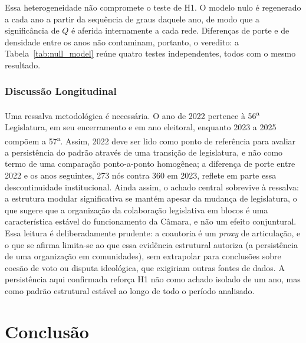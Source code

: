 \documentclass[
      12pt,
      a4paper,
      openright,
      oneside,
      chapter=TITLE,
      section=TITLE,
      english,
      french,
      spanish,
      brazilian
    ]{abntex2}
\begin{document}
    Essa heterogeneidade não compromete o teste de H1. O modelo nulo é regenerado a cada ano a partir da sequência de graus daquele ano, de modo que a significância de $Q$ é aferida internamente a cada rede. Diferenças de porte e de densidade entre os anos não contaminam, portanto, o veredito: a Tabela~\ref{tab:null_model} reúne quatro testes independentes, todos com o mesmo resultado.
    
    \subsection{Discussão Longitudinal}
    
    Uma ressalva metodológica é necessária. O ano de 2022 pertence à 56\textsuperscript{a} Legislatura, em seu encerramento e em ano eleitoral, enquanto 2023 a 2025 compõem a 57\textsuperscript{a}. Assim, 2022 deve ser lido como ponto de referência para avaliar a persistência do padrão através de uma transição de legislatura, e não como termo de uma comparação ponto-a-ponto homogênea; a diferença de porte entre 2022 e os anos seguintes, 273 nós contra 360 em 2023, reflete em parte essa descontinuidade institucional. Ainda assim, o achado central sobrevive à ressalva: a estrutura modular significativa se mantém apesar da mudança de legislatura, o que sugere que a organização da colaboração legislativa em blocos é uma característica estável do funcionamento da Câmara, e não um efeito conjuntural. Essa leitura é deliberadamente prudente: a coautoria é um \textit{proxy} de articulação, e o que se afirma limita-se ao que essa evidência estrutural autoriza (a persistência de uma organização em comunidades), sem extrapolar para conclusões sobre coesão de voto ou disputa ideológica, que exigiriam outras fontes de dados. A persistência aqui confirmada reforça H1 não como achado isolado de um ano, mas como padrão estrutural estável ao longo de todo o período analisado.
    
    \chapter{Conclusão}
    \label{cap:conclusao}
    
\end{document}
